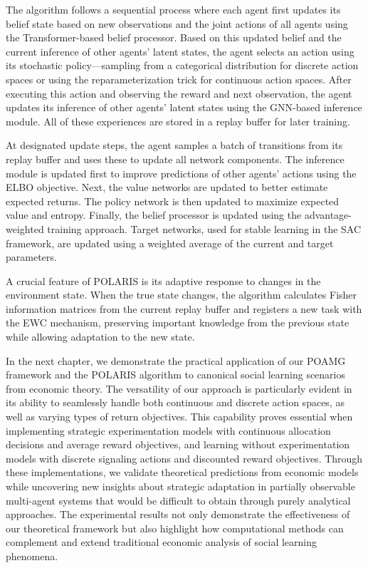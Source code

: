 The algorithm follows a sequential process where each agent first updates its belief state based on new observations and the joint actions of all agents using the Transformer-based belief processor. Based on this updated belief and the current inference of other agents' latent states, the agent selects an action using its stochastic policy—sampling from a categorical distribution for discrete action spaces or using the reparameterization trick for continuous action spaces. After executing this action and observing the reward and next observation, the agent updates its inference of other agents' latent states using the GNN-based inference module. All of these experiences are stored in a replay buffer for later training.

At designated update steps, the agent samples a batch of transitions from its replay buffer and uses these to update all network components. The inference module is updated first to improve predictions of other agents' actions using the ELBO objective. Next, the value networks are updated to better estimate expected returns. The policy network is then updated to maximize expected value and entropy. Finally, the belief processor is updated using the advantage-weighted training approach. Target networks, used for stable learning in the SAC framework, are updated using a weighted average of the current and target parameters.

A crucial feature of POLARIS is its adaptive response to changes in the environment state. When the true state changes, the algorithm calculates Fisher information matrices from the current replay buffer and registers a new task with the EWC mechanism, preserving important knowledge from the previous state while allowing adaptation to the new state.

In the next chapter, we demonstrate the practical application of our POAMG framework and the POLARIS algorithm to canonical social learning scenarios from economic theory. The versatility of our approach is particularly evident in its ability to seamlessly handle both continuous and discrete action spaces, as well as varying types of return objectives. This capability proves essential when implementing strategic experimentation models with continuous allocation decisions and average reward objectives, and learning without experimentation models with discrete signaling actions and discounted reward objectives. Through these implementations, we validate theoretical predictions from economic models while uncovering new insights about strategic adaptation in partially observable multi-agent systems that would be difficult to obtain through purely analytical approaches. The experimental results not only demonstrate the effectiveness of our theoretical framework but also highlight how computational methods can complement and extend traditional economic analysis of social learning phenomena.

